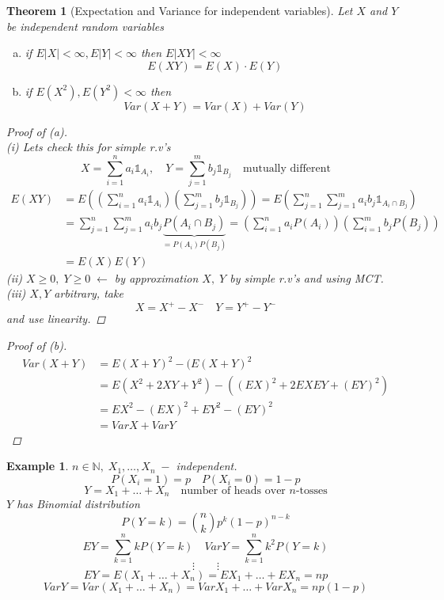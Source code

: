 \documentclass[12pt]{article}
\def\NN{\mathbb{N}}
\newtheorem{theorem}{Theorem}[section]
\newtheorem{example}{Example}[section]
\begin{document}
\begin{theorem}[Expectation and Variance for independent variables]
Let $X$ and $Y$ be independent random variables
\begin{enumerate}[(a)]
\item if $E|X| < \infty, E|Y| < \infty$ then $E|XY| < \infty$
\[E(XY)=E(X)\cdot E(Y)\]
\item if $E(X^2), E(Y^2) < \infty$ then 
\[Var(X+Y)= Var(X) + Var(Y) \]
\end{enumerate}
\begin{proof}[Proof of (a)]\quad \\
(i) Lets check this for simple r.v's 
\[X= \sum\limits_{i=1}^{n}a_i{\mathbb 1}_{A_i}, \quad Y= \sum\limits_{j=1}^{m}b_j{\mathbb 1}_{B_j}\quad \text{mutually different}\]
\begin{align*}
E(XY) &= E((\sum\limits_{i=1}^{n}a_i{\mathbb 1}_{A_i})(\sum\limits_{j=1}^{m}b_j{\mathbb 1}_{B_j})) = E(\sum\limits_{j=1}^{n}\sum\limits_{j=1}^{m}a_ib_j{\mathbb 1}_{A_i\cap B_j})\\  &= \sum\limits_{j=1}^{n}\sum\limits_{j=1}^{m}a_ib_j\underbrace{P(A_i\cap B_j)}_{= P(A_i)P(B_j)} = (\sum\limits_{i=1}^{n}a_iP(A_i))(\sum\limits_{i=1}^{m}b_jP(B_j)) \\ &= E(X)E(Y)\end{align*}
(ii) $X\geq 0, \; Y \geq 0 \; \leftarrow$ by approximation $X, \; Y$ by simple r.v's and using MCT.\\
(iii) $X, Y$ arbitrary, take
\[X= X^+ - X^- \quad Y=Y^+ - Y^- \]
and use linearity.
\end{proof}
\begin{proof}[Proof of (b)]
\begin{align*}
Var(X+Y) &= E(X+Y)^2 - (E(X+Y)^2  \\ &= E(X^2 +2XY +Y^2) - ((EX)^2 +2EXEY + (EY)^2) \\ &= EX^2 -(EX)^2 + EY^2 - (EY)^2 \\ &= VarX + VarY\end{align*}
\end{proof}
\end{theorem}

\begin{example}
$n \in \NN, \; X_1 , \dots , X_n \; - $ independent. 
\[P(X_i= 1) = p \quad P(X_i=0)= 1-p\]
\[Y=X_1 + \dots + X_n \quad \text{number of heads over $n$-tosses}\]
$Y$ has Binomial distribution
\[P(Y=k) = {n \choose k}p^k(1-p)^{n-k}\]
\[EY= \sum\limits_{k=1}^{n}kP(Y=k) \quad VarY=\sum\limits_{k=1}^{n}k^2P(Y=k) \]
\[\vdots \qquad \vdots\]
\[EY= E(X_1 + \dots + X_n) = EX_1 + \dots + EX_n = np\]
\[VarY = Var(X_1 + \dots + X_n) = VarX_1 + \dots + VarX_n = np(1-p)\]
\end{example}
\end{document}
